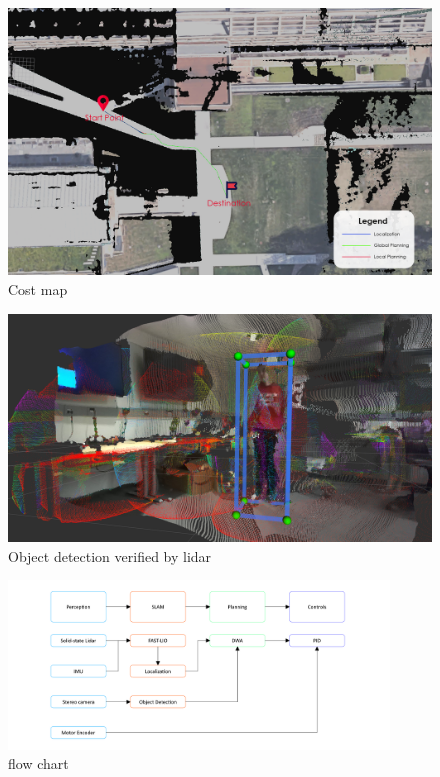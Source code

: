 \documentclass[balance,upint,subscriptcorrection,varvw,nofoot, mathalfa=cal=boondoxo,spanish,french,vietnamese,russian,greek,pdf-a,fontspec,colorlinks]{asmeconf}
\begin{document}
\begin{figure}
\centering\includegraphics[width=0.7\linewidth]{Planning_psed.png}
\caption{Cost map}
\end{figure}
 
\begin{figure}
\centering\includegraphics[width=0.7\linewidth]{obj_det.png}
\caption{Object detection verified by lidar}
\end{figure}


\begin{figure}[h]
\center
\includegraphics[width=0.9\textwidth]{flow_chart.png}
\caption{flow chart}
\end{figure}

\end{document}
